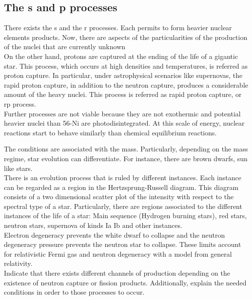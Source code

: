 \documentclass[openany]{book}
\begin{document}
\subsection{The s and p processes} \label{sub:spProcesses}

There exists the s and  the r processes. Each permits to form heavier nuclear elements products. Now, there are aspects of the particularities of the production of the nuclei that  are currently  unknown \\

On the other hand, protons are captured at the ending of the life of a gigantic star. This process, which occurs at high densities and temperatures, is referred as proton capture. In particular, under astrophysical scenarios like supernovas, the rapid proton capture, in addition to the neutron capture,  produces a considerable amount of the heavy nuclei. This process is referred as rapid proton capture, or rp process. \\ 

Further processes are not viable because they are not exothermic and potential heavier nuclei than 56-Ni are photodisintegrated. At this scale of energy, nuclear reactions start to behave similarly than chemical equilibrium reactions. 

The conditions are associated with the mass. Particularly, depending on the mass regime, star evolution can differentiate. For instance, there are brown dwarfs, sun like stars. \\

There is an evolution process that is ruled by different instances. Each instance can be regarded as a region in the Hertzsprung-Russell diagram. This diagram consists of a two dimensional scatter plot of the intensity with respect to the spectral type of a star. Particularly, there are regions associated to the different instances of the life of a star: Main sequence (Hydrogen burning stars), red stars, neutron stars, supernova of kinds Ia Ib and other instances. \\

Electron degeneracy prevents the white dwarf to collapse and the neutron degeneracy pressure prevents the neutron star to collapse. These limits account for relativistic Fermi gas and neutron degeneracy with a model from general relativity. \\

Indicate that there exists different channels of production depending on the existence of neutron capture or fission products. Additionally, explain the needed conditions in order to those processes to occur. \\ 
\end{document}

